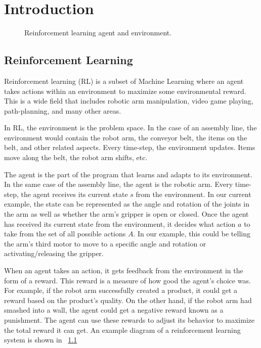 \documentclass[12pt]{thesis}
\begin{document}
\body


\chapter{Introduction}
\begin{figure}
	\begin{center}
		\scalebox{0.5}{}
	\end{center}
	\caption{Reinforcement learning agent and environment.}
	\label{fig:RLagent}
\end{figure}
\section{Reinforcement Learning}
Reinforcement learning (RL) is a subset of Machine Learning where an agent takes actions within an environment to maximize some environmental reward. \cite{Sutton1998} This is a wide field that includes robotic arm manipulation, video game playing, path-planning, and many other areas.

In RL, the environment is the problem space. In the case of an assembly line, the environment would contain the robot arm, the conveyor belt, the items on the belt, and other related aspects. Every time-step, the environment updates. Items move along the belt, the robot arm shifts, etc.

The agent is the part of the program that learns and adapts to its environment. In the same case of the assembly line, the agent is the robotic arm. Every time-step, the agent receives its current state $s$ from the environment. In our current example, the state can be represented as the angle and rotation of the joints in the arm as well as whether the arm’s gripper is open or closed. Once the agent has received its current state from the environment, it decides what action $a$ to take from the set of all possible actions $A$. In our example, this could be telling the arm’s third motor to move to a specific angle and rotation or activating/releasing the gripper.

When an agent takes an action, it gets feedback from the environment in the form of a reward. This reward is a measure of how good the agent’s choice was. For example, if the robot arm successfully created a product, it could get a reward based on the product’s quality. On the other hand, if the robot arm had smashed into a wall, the agent could get a negative reward known as a punishment. The agent can use these rewards to adjust its behavior to maximize the total reward it can get. An example diagram of a reinforcement learning system is shown in \figurename~\ref{fig:RLagent} 
\end{document}
